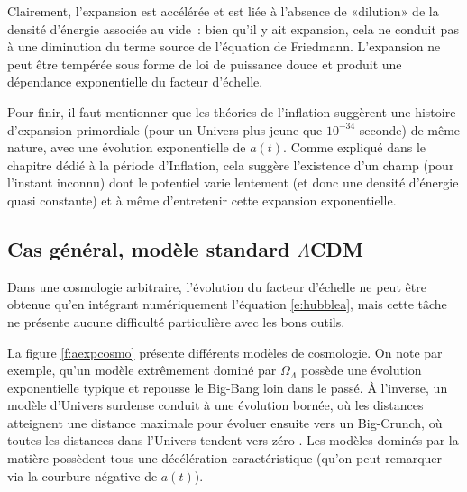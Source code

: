 Clairement, l'expansion est accélérée et est liée à l'absence de «dilution» de la densité d'énergie associée au vide~: bien qu'il y ait expansion, cela ne conduit pas à une diminution du terme source de l'équation de Friedmann. L'expansion ne peut être tempérée sous forme de loi de puissance douce et produit une dépendance exponentielle du facteur d'échelle. 

Pour finir, il faut mentionner que les théories de l'inflation suggèrent une histoire d'expansion primordiale (pour un Univers plus jeune que $10^{-34}$ seconde) de même nature, avec une évolution exponentielle de $a(t)$.  Comme expliqué dans le chapitre dédié à la période d'Inflation, cela suggère l'existence d'un champ (pour l'instant inconnu) dont le potentiel varie lentement (et donc une densité d'énergie quasi constante) et à même d'entretenir cette expansion exponentielle.

\subsection{Cas général, modèle standard $\Lambda$CDM }
Dans une cosmologie arbitraire, l'évolution du facteur d'échelle ne peut être obtenue qu'en intégrant numériquement l'équation \ref{e:hubblea}, mais cette tâche ne présente aucune difficulté particulière avec les bons outils. 

La figure \ref{f:aexpcosmo} présente différents modèles de cosmologie. On note par exemple, qu'un modèle extrêmement dominé par $\Omega_\Lambda$ possède une évolution exponentielle typique et repousse le Big-Bang loin dans le passé. À l'inverse, un modèle d'Univers surdense conduit à une évolution bornée, où les distances atteignent une distance maximale pour évoluer ensuite vers un Big-Crunch, où toutes les distances dans l'Univers tendent vers zéro . Les modèles dominés par la matière possèdent tous une décélération caractéristique (qu'on peut remarquer via la courbure négative de $a(t)$).

